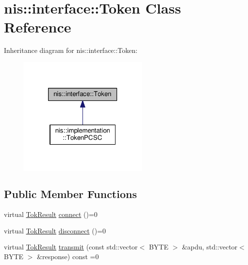 \hypertarget{classnis_1_1interface_1_1Token}{\section{nis\-:\-:interface\-:\-:Token Class Reference}
\label{classnis_1_1interface_1_1Token}
}


Inheritance diagram for nis\-:\-:interface\-:\-:Token\-:
\nopagebreak
\begin{figure}[H]
\begin{center}
\leavevmode
\includegraphics[width=184pt]{classnis_1_1interface_1_1Token__inherit__graph}
\end{center}
\end{figure}
\subsection*{Public Member Functions}
\begin{DoxyCompactItemize}
\item 
virtual \hyperlink{nis__types_8h_a6ef53483e8ce2f8bc58bd1f75b3d0b38}{Tok\-Result} \hyperlink{classnis_1_1interface_1_1Token_aaf1c3de8b5eb45c9b10e4a1b580354d4}{connect} ()=0
\item 
virtual \hyperlink{nis__types_8h_a6ef53483e8ce2f8bc58bd1f75b3d0b38}{Tok\-Result} \hyperlink{classnis_1_1interface_1_1Token_a27780784790d95f9724c256175561fea}{disconnect} ()=0
\item 
virtual \hyperlink{nis__types_8h_a6ef53483e8ce2f8bc58bd1f75b3d0b38}{Tok\-Result} \hyperlink{classnis_1_1interface_1_1Token_ad81a57e70235b95cc404d20814f2e79d}{transmit} (const std\-::vector$<$ B\-Y\-T\-E $>$ \&apdu, std\-::vector$<$ B\-Y\-T\-E $>$ \&response) const =0
\end{DoxyCompactItemize}


